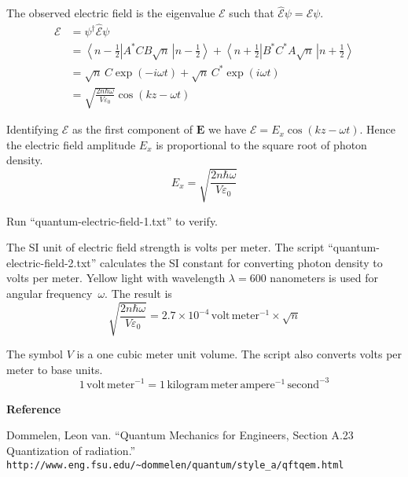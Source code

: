 \documentclass[12pt]{article}
\begin{document}
\noindent
The observed electric field is the eigenvalue $\mathscr{E}$ such that $\hat{\mathscr{E}}\psi=\mathscr{E}\psi$.
\begin{align*}
\mathscr{E}
&=\psi^\dagger\hat{\mathscr{E}}\psi\\
&=\left\langle n-\tfrac{1}{2}\right|A^*CB\sqrt{n}\,\left|n-\tfrac{1}{2}\right\rangle
+\left\langle n+\tfrac{1}{2}\right|B^*C^*A\sqrt{n}\,\left|n+\tfrac{1}{2}\right\rangle\\
&=\sqrt{n}\,C\exp(-i\omega t)+\sqrt{n}\,C^*\exp(i\omega t)\\
&=\sqrt{\frac{2n\hbar\omega}{V\varepsilon_0}}\cos(kz-\omega t)
\end{align*}

\noindent
Identifying $\mathscr{E}$ as the first component of $\mathbf{E}$ we have $\mathscr{E}=E_x\cos(kz-\omega t)$.
Hence the electric field amplitude $E_x$ is proportional to the square root of photon density.
$$
E_x=\sqrt{\frac{2n\hbar\omega}{V\varepsilon_0}}
$$

\noindent
Run ``quantum-electric-field-1.txt'' to verify.

\bigskip
\noindent
The SI unit of electric field strength is volts per meter.
The script ``quantum-electric-field-2.txt'' calculates the SI constant
for converting photon density to volts per meter.
Yellow light with wavelength $\lambda=600$ nanometers is used for
angular frequency~$\omega$.
The result is
$$
\sqrt{\frac{2n\hbar\omega}{V\varepsilon_0}}
=2.7\times10^{-4}\,\text{volt}\,\text{meter}^{-1}\times\sqrt{n}
$$

\noindent
The symbol $V$ is a one cubic meter unit volume.
The script also converts volts per meter to base units.
$$
1\,\text{volt}\,\text{meter}^{-1}
=1\,\text{kilogram}\,\text{meter}\,\text{ampere}^{-1}\,\text{second}^{-3}
$$

\bigskip
\noindent
{\bf Reference}

\bigskip
\noindent
Dommelen, Leon van. ``Quantum Mechanics for Engineers, Section A.23 Quantization of radiation.''
\verb$http://www.eng.fsu.edu/~dommelen/quantum/style_a/qftqem.html$
\end{document}
